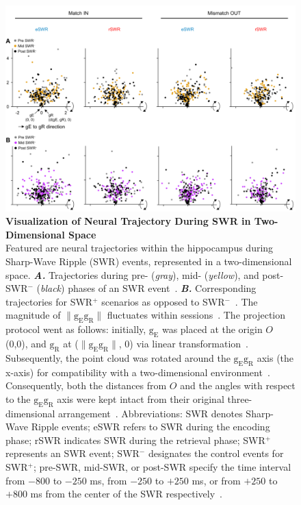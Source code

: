 \documentclass[final,3p,times,twocolumn]{elsarticle}
\begin{document}
        \begin{figure}[ht]
        	\centering
            \includegraphics[width=1\textwidth]{./src/figures/.png/Figure_ID_06.png}
        	\caption{\textbf{
Visualization of Neural Trajectory During SWR in Two-Dimensional Space
}
\smallskip
\\
Featured are neural trajectories within the hippocampus during Sharp-Wave Ripple (SWR) events, represented in a two-dimensional space. \textbf{\textit{A.}} Trajectories during pre- (\textit{gray}), mid- (\textit{yellow}), and post-SWR$^-$ (\textit{black}) phases of an SWR event~\cite{buzsaki_hippocampal_2015}. \textbf{\textit{B.}} Corresponding trajectories for SWR$^+$ scenarios as opposed to SWR$^-$~\cite{fernandez-ruiz_long-duration_2019}. The magnitude of $\lVert \mathrm{g_{E}g_{R}} \rVert$ fluctuates within sessions~\cite{liu_consensus_2022}. The projection protocol went as follows: initially, $\mathrm{g_{E}}$ was placed at the origin $O$ (0,0), and $\mathrm{g_{R}}$ at ($\lVert \mathrm{g_{E}g_{R}} \rVert$, 0) via linear transformation~\cite{kim_corticalhippocampal_2022}. Subsequently, the point cloud was rotated around the $\mathrm{g_{E}g_{R}}$ axis (the x-axis) for compatibility with a two-dimensional environment~\cite{yu_gaussian-process_2009}. Consequently, both the distances from $O$ and the angles with respect to the $\mathrm{g_{E}g_{R}}$ axis were kept intact from their original three-dimensional arrangement~\cite{mcinnes_umap_2018}. Abbreviations: SWR denotes Sharp-Wave Ripple events; eSWR refers to SWR during the encoding phase; rSWR indicates SWR during the retrieval phase; SWR$^+$ represents an SWR event; SWR$^-$ designates the control events for SWR$^+$; pre-SWR, mid-SWR, or post-SWR specify the time interval from $-800$ to $-250$ ms, from $-250$ to $+250$ ms, or from $+250$ to $+800$ ms from the center of the SWR respectively~\cite{zhang_hippocampal_2022}.
}
        	\label{fig:06}
        \end{figure}
\end{document}
